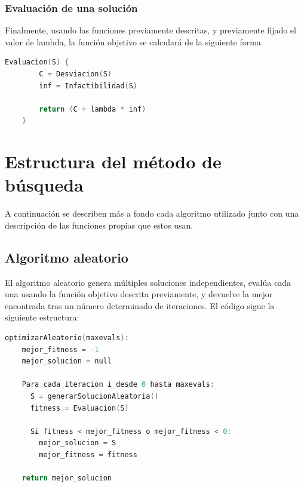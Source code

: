 \documentclass[12pt]{article}
\begin{document}
    \subsubsection{Evaluación de una solución}
    Finalmente, usando las funciones previamente descritas, y previamente fijado el valor de lambda, la función objetivo se calculará de la siguiente forma
\begin{lstlisting}[language=C++, mathescape=true, caption={Pseudocódigo del cálculo de la función objetivo}, label={lst:infeasibility}]
Evaluacion(S) {
        C = Desviacion(S)
        inf = Infactibilidad(S)

        return (C + lambda * inf)
    }
\end{lstlisting}

    \newpage

    \section{Estructura del método de búsqueda}
    A continuación se describen más a fondo cada algoritmo utilizado junto con una descripción de las funciones propias que estos usan. 

    \subsection{Algoritmo aleatorio}

    El algoritmo aleatorio genera múltiples soluciones independientes, evalúa cada una usando la función objetivo descrita previamente, y devuelve la mejor encontrada tras un número determinado de iteraciones. El código sigue la siguiente estructura:

\begin{lstlisting}[language=C++,mathescape=true, caption={Estructura del algoritmo aleatorio}, label={lst:VresStructure}]
optimizarAleatorio(maxevals):
    mejor_fitness = -1
    mejor_solucion = null

    Para cada iteracion i desde 0 hasta maxevals:
      S = generarSolucionAleatoria()
      fitness = Evaluacion(S)

      Si fitness < mejor_fitness o mejor_fitness < 0: 
        mejor_solucion = S
        mejor_fitness = fitness
      
    return mejor_solucion
\end{lstlisting}
\end{document}
